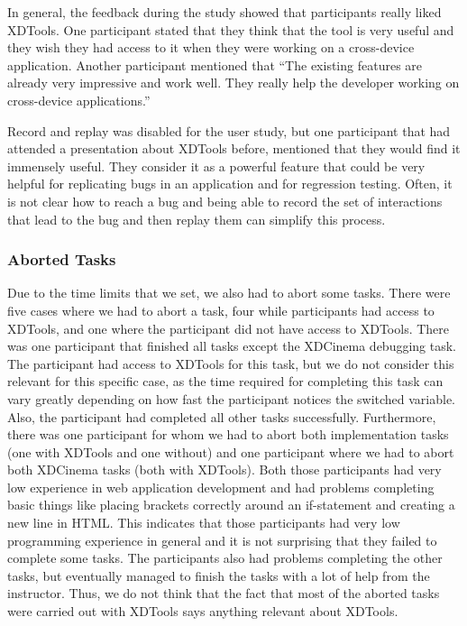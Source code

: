 In general, the feedback during the study showed that participants really liked XDTools. One participant stated that they think that the tool is very useful and they wish they had access to it when they were working on a cross-device application. Another participant mentioned that ``The existing features are already very impressive and work well. They really help the developer working on cross-device applications.''

Record and replay was disabled for the user study, but one participant that had attended a presentation about XDTools before, mentioned that they would find it immensely useful. They consider it as a powerful feature that could be very helpful for replicating bugs in an application and for regression testing. Often, it is not clear how to reach a bug and being able to record the set of interactions that lead to the bug and then replay them can simplify this process.

\subsubsection{Aborted Tasks}

Due to the time limits that we set, we also had to abort some tasks. There were five cases where we had to abort a task, four while participants had access to XDTools, and one where the participant did not have access to XDTools. There was one participant that finished all tasks except the XDCinema debugging task. The participant had access to XDTools for this task, but we do not consider this relevant for this specific case, as the time required for completing this task can vary greatly depending on how fast the participant notices the switched variable. Also, the participant had completed all other tasks successfully. Furthermore, there was one participant for whom we had to abort both implementation tasks (one with XDTools and one without) and one participant where we had to abort both XDCinema tasks (both with XDTools). Both those participants had very low experience in web application development and had problems completing basic things like placing brackets correctly around an if-statement and creating a new line in HTML. This indicates that those participants had very low programming experience in general and it is not surprising that they failed to complete some tasks. The participants also had problems completing the other tasks, but eventually managed to finish the tasks with a lot of help from the instructor. Thus, we do not think that the fact that most of the aborted tasks were carried out with XDTools says anything relevant about XDTools. 

